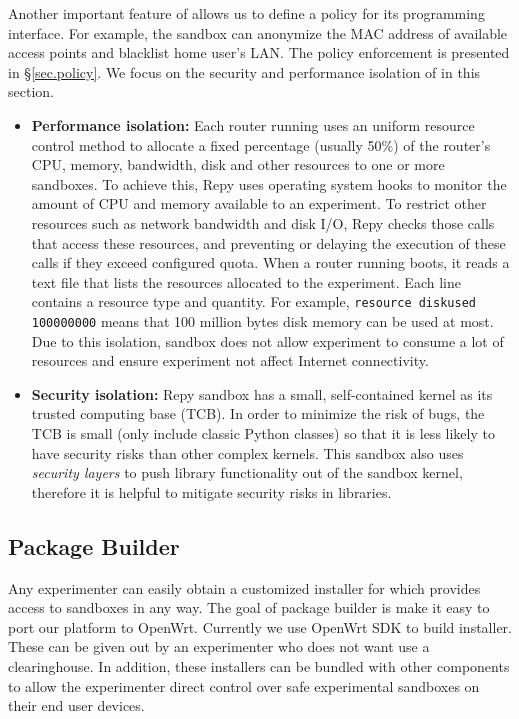 Another important feature of \sandboxname allows us to define a policy for its programming interface. For example, the sandbox can anonymize the MAC address of available access points and blacklist home user's LAN. The policy enforcement is presented in \S{\ref{sec.policy}}. We focus on the security and performance isolation of \sandboxname in this section.
\begin{itemize}
\item \textbf{Performance isolation: }Each router running \sysname uses an uniform resource control method to allocate a fixed percentage (usually 50\%) of the router's CPU, memory, bandwidth, disk and other resources to one or more sandboxes. To achieve this, Repy uses operating system hooks to monitor the amount of CPU and memory available to an experiment. To restrict other resources such as network bandwidth and disk I/O, Repy checks those calls that access these resources, and preventing or delaying the execution of these calls if they exceed configured quota. When a router running \sysname boots, it reads a text file that lists the resources allocated to the experiment. Each line contains a resource type and quantity. For example, \texttt{resource diskused 100000000} means that 100 million bytes disk memory can be used at most. Due to this isolation, sandbox does not allow experiment to consume a lot of resources and ensure experiment not affect Internet connectivity.

\item \textbf{Security isolation: }Repy sandbox has a small, self-contained kernel as its trusted computing base (TCB). In order to minimize the risk of bugs, the TCB is small (only include classic Python classes) so that it is less likely to have security risks than other complex kernels. This sandbox also uses \textit{security layers} to push library functionality out of the sandbox kernel, therefore it is helpful to mitigate security risks in libraries. 

\end{itemize}
\subsection{Package Builder}
\label{sec.packagebuilder}
Any experimenter can easily obtain a customized installer for \sysname which provides access to sandboxes in any way. The goal of package builder is make it easy to port our platform to OpenWrt. Currently we use OpenWrt SDK to build installer. These can be given out by an experimenter who does not want use a clearinghouse. In addition, these installers can be bundled with other components to allow the experimenter direct control over safe experimental sandboxes on their end user devices.

